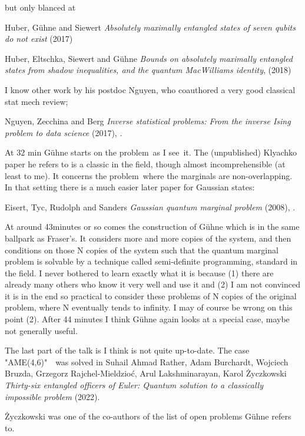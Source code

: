 \begin{description}
but only blanced at

Huber, G{\"{u}}hne and Siewert
{\em Absolutely maximally entangled states of seven qubits do not exist} (2017)

Huber, Eltschka, Siewert and G{\"{u}}hne
{\em Bounds on absolutely maximally entangled states from shadow
inequalities, and the quantum {MacWilliams} identity},
(2018)

I know other work by his postdoc
Nguyen, who coauthored a very good classical stat mech review;

Nguyen, Zecchina and Berg
{\em Inverse statistical problems: {From} the inverse {Ising} problem to data science}
(2017), .

At 32 min G\"{u}hne starts on the problem as I see it.
The (unpublished) Klyachko paper he refers to is a classic in
the field, though almost incomprehensible (at least to me). It concerns the
problem where the marginals are non-overlapping. In that setting there is a
much easier later paper for Gaussian states:

Eisert, Tyc, Rudolph and Sanders
{\em Gaussian quantum marginal problem} (2008), . 

At around 43minutes or so comes the construction of G\"{u}hne which is in the
same ballpark as Fraser's. It considers more and more copies of the system,
and then conditions on those N copies of the system such that the quantum
marginal problem is solvable by a technique called semi-definite programming,
standard in the field. I never bothered to learn exactly what it is because
(1) there are already many others who know it very well and use it and (2) I
am not convinced it is in the end so practical to consider these problems of
N copies of the original problem, where N eventually tends to infinity. I may
of course be wrong on this point (2). After 44 minutes I think G\"{u}hne again
looks at a special case, maybe not generally useful.

The last part of the talk is I think is not quite
up-to-date. The case "AME(4,6)"  was solved in
%
    Suhail Ahmad Rather, Adam Burchardt, Wojciech Bruzda, Grzegorz
    Rajchel-Mieldzio\'c, Arul Lakshminarayan, Karol {\.{Z}}yczkowski
    {\em Thirty-six entangled officers of Euler: Quantum solution to a
    classically impossible problem} (2022).

{\.{Z}}yczkowski
was one of the co-authors of the list of open problems G\"{u}hne refers to.


\end{description}
